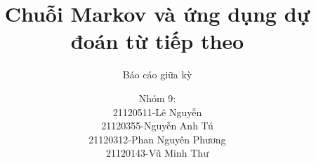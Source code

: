\title{Chuỗi Markov và ứng dụng dự đoán từ tiếp theo}
\subtitle{Báo cáo giữa kỳ}


\author[Nhóm 9]{Nhóm 9: \\ 21120511-Lê Nguyễn \\ 21120355-Nguyễn Anh Tú \\ 21120312-Phan Nguyên Phương \\ 21120143-Vũ Minh Thư}

\date{}

\renewcommand{\P}{\mathbb{P}}